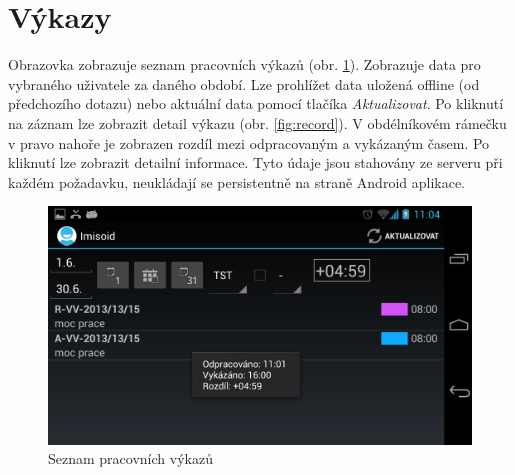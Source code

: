 \documentclass{diplomka}
\begin{document}
\section{Výkazy}
\label{sec:records}
Obrazovka zobrazuje seznam pracovních výkazů (obr. \ref{fig:records}). Zobrazuje data pro vybraného uživatele za daného období. Lze prohlížet data uložená offline (od předchozího dotazu) nebo aktuální data pomocí tlačíka \emph{Aktualizovat}. Po kliknutí na záznam lze zobrazit detail výkazu (obr. \ref{fig:record}). V obdélníkovém rámečku v pravo nahoře je zobrazen rozdíl mezi odpracovaným a vykázaným časem. Po kliknutí lze zobrazit detailní informace. Tyto údaje jsou stahovány ze serveru při každém požadavku, neukládají se persistentně na straně Android aplikace.
\begin{figure}[H]
  \centering
  \includegraphics[scale=0.25]{scr/records.png}
    \caption{Seznam pracovních výkazů}
  \label{fig:records}
\end{figure}
\end{document}
